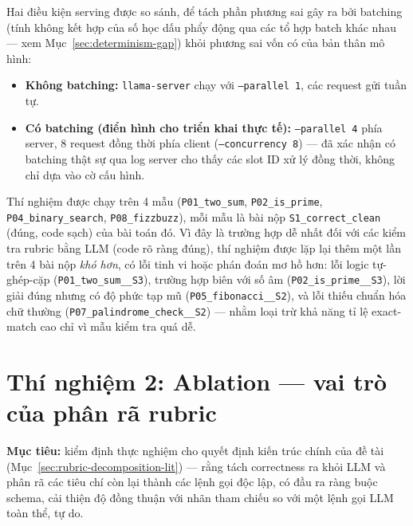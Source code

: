\documentclass[a4paper,12pt]{report}
\begin{document}
Hai điều kiện serving được so sánh, để tách phần phương sai gây ra bởi
batching (tính không kết hợp của số học dấu phẩy động qua các tổ hợp batch
khác nhau — xem Mục~\ref{sec:determinism-gap}) khỏi phương sai vốn có của
bản thân mô hình:
\begin{itemize}
  \item \textbf{Không batching:} \texttt{llama-server} chạy với
    \texttt{--parallel 1}, các request gửi tuần tự.
  \item \textbf{Có batching (điển hình cho triển khai thực tế):}
    \texttt{--parallel 4} phía server, 8 request đồng thời phía client
    (\texttt{--concurrency 8}) — đã xác nhận có batching thật sự qua log
    server cho thấy các slot ID xử lý đồng thời, không chỉ dựa vào cờ cấu
    hình.
\end{itemize}

Thí nghiệm được chạy trên 4 mẫu (\texttt{P01\_two\_sum},
\texttt{P02\_is\_prime}, \texttt{P04\_binary\_search},
\texttt{P08\_fizzbuzz}), mỗi mẫu là bài nộp \texttt{S1\_correct\_clean}
(đúng, code sạch) của bài toán đó. Vì đây là trường hợp dễ nhất đối với các
kiểm tra rubric bằng LLM (code rõ ràng đúng), thí nghiệm được lặp lại thêm
một lần trên 4 bài nộp \emph{khó hơn}, có lỗi tinh vi hoặc phán đoán mơ hồ
hơn: lỗi logic tự-ghép-cặp (\texttt{P01\_two\_sum\_\_S3}), trường hợp biên
với số âm (\texttt{P02\_is\_prime\_\_S3}), lời giải đúng nhưng có độ phức
tạp mũ (\texttt{P05\_fibonacci\_\_S2}), và lỗi thiếu chuẩn hóa chữ thường
(\texttt{P07\_palindrome\_check\_\_S2}) — nhằm loại trừ khả năng tỉ lệ
exact-match cao chỉ vì mẫu kiểm tra quá dễ.

\section{Thí nghiệm 2: Ablation — vai trò của phân rã rubric}
\label{sec:exp-ablation}

\textbf{Mục tiêu:} kiểm định thực nghiệm cho quyết định kiến trúc chính của
đề tài (Mục~\ref{sec:rubric-decomposition-lit}) — rằng tách correctness ra
khỏi LLM và phân rã các tiêu chí còn lại thành các lệnh gọi độc lập, có đầu
ra ràng buộc schema, cải thiện độ đồng thuận với nhãn tham chiếu so với một
lệnh gọi LLM toàn thể, tự do.
\end{document}
